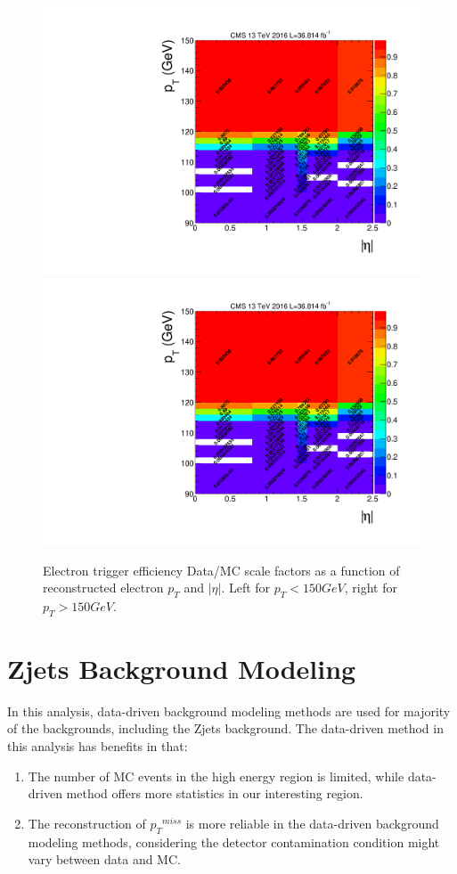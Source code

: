 \begin{figure}[htpb]
\begin{center}
\includegraphics[width=0.49\linewidth, page=5]{figures/hlt115electron_2016fulleff_absetapt.pdf}
\includegraphics[width=0.49\linewidth, page=6]{figures/hlt115electron_2016fulleff_absetapt.pdf}
\caption{Electron trigger efficiency Data/MC scale factors as a function of reconstructed electron $p_T$ and $|\eta|$. Left for $p_T <150 GeV$, right for $p_T >150GeV$. }
\label{fig:trgeff_el_sf}
\end{center}
\end{figure}

\section{Zjets Background Modeling}\label{sec:dybk}
In this analysis, data-driven background modeling methods are used for majority of the backgrounds, including the Zjets background. The data-driven method in this analysis has benefits in that:
\begin{enumerate}
\item The number of MC events in the high energy region is limited, while data-driven method offers more statistics in our interesting region.
\item The reconstruction of ${p_{T}}^{miss}$ is more reliable in the data-driven background modeling methods, considering the detector contamination condition might vary between data and MC.
\end{enumerate}

